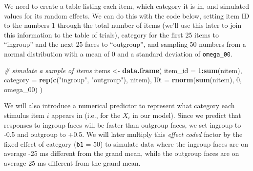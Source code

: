 \documentclass[doc,floatsintext]{apa6}
\newenvironment{Shaded}{\begin{snugshade}}{\end{snugshade}}
\newcommand{\KeywordTok}[1]{\textcolor[rgb]{0.13,0.29,0.53}{\textbf{#1}}}
\newcommand{\DataTypeTok}[1]{\textcolor[rgb]{0.13,0.29,0.53}{#1}}
\newcommand{\DecValTok}[1]{\textcolor[rgb]{0.00,0.00,0.81}{#1}}
\newcommand{\FloatTok}[1]{\textcolor[rgb]{0.00,0.00,0.81}{#1}}
\newcommand{\StringTok}[1]{\textcolor[rgb]{0.31,0.60,0.02}{#1}}
\newcommand{\CommentTok}[1]{\textcolor[rgb]{0.56,0.35,0.01}{\textit{#1}}}
\newcommand{\OperatorTok}[1]{\textcolor[rgb]{0.81,0.36,0.00}{\textbf{#1}}}
\newcommand{\NormalTok}[1]{#1}
\begin{document}
We need to create a table listing each item, which category it is in,
and simulated values for its random effects. We can do this with the
code below, setting item ID to the numbers 1 through the total number of
items (we'll use this later to join this information to the table of
trials), category for the first 25 items to \enquote{ingroup} and the
next 25 faces to \enquote{outgroup}, and sampling 50 numbers from a
normal distribution with a mean of 0 and a standard deviation of
\texttt{omega\_00}.

\begin{Shaded}
\begin{Highlighting}[]
\CommentTok{# simulate a sample of items}
\NormalTok{items <-}\StringTok{ }\KeywordTok{data.frame}\NormalTok{(}
  \DataTypeTok{item_id =} \DecValTok{1}\OperatorTok{:}\KeywordTok{sum}\NormalTok{(nitem),}
  \DataTypeTok{category =} \KeywordTok{rep}\NormalTok{(}\KeywordTok{c}\NormalTok{(}\StringTok{"ingroup"}\NormalTok{, }\StringTok{"outgroup"}\NormalTok{), nitem),}
  \DataTypeTok{I0i =} \KeywordTok{rnorm}\NormalTok{(}\KeywordTok{sum}\NormalTok{(nitem), }\DecValTok{0}\NormalTok{, omega_}\DecValTok{00}\NormalTok{)}
\NormalTok{)}
\end{Highlighting}
\end{Shaded}

We will also introduce a numerical predictor to represent what category
each stimulus item \(i\) appears in (i.e., for the \(X_i\) in our
model). Since we predict that responses to ingroup faces will be faster
than outgroup faces, we set ingroup to -0.5 and outgroup to +0.5. We
will later multiply this \emph{effect coded} factor by the fixed effect
of category (\texttt{b1} = 50) to simulate data where the ingroup faces
are on average -25 ms different from the grand mean, while the outgroup
faces are on average 25 ms different from the grand mean.

\begin{Shaded}
\end{Shaded}
\end{document}

